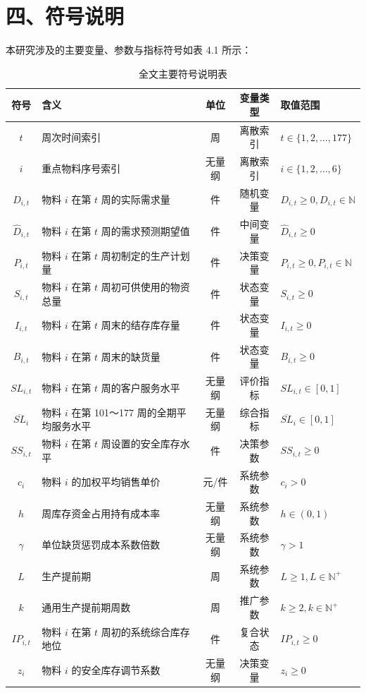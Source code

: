 \section{四、符号说明}\label{ux56dbux7b26ux53f7ux8bf4ux660e}

本研究涉及的主要变量、参数与指标符号如表 4.1 所示：

\begin{table}[H]
\centering
\caption{全文主要符号说明表}
\label{tab:notation}
\begin{tabular}{clccl}
\toprule
\textbf{符号} & \textbf{含义} & \textbf{单位} & \textbf{变量类型} & \textbf{取值范围} \\
\midrule
$t$ & 周次时间索引 & 周 & 离散索引 & $t \in \{1, 2, \dots, 177\}$ \\
$i$ & 重点物料序号索引 & 无量纲 & 离散索引 & $i \in \{1, 2, \dots, 6\}$ \\
$D_{i,t}$ & 物料 $i$ 在第 $t$ 周的实际需求量 & 件 & 随机变量 & $D_{i,t} \ge 0, D_{i,t} \in \mathbb{N}$ \\
$\hat{D}_{i,t}$ & 物料 $i$ 在第 $t$ 周的需求预测期望值 & 件 & 中间变量 & $\hat{D}_{i,t} \ge 0$ \\
$P_{i,t}$ & 物料 $i$ 在第 $t$ 周初制定的生产计划量 & 件 & 决策变量 & $P_{i,t} \ge 0, P_{i,t} \in \mathbb{N}$ \\
$S_{i,t}$ & 物料 $i$ 在第 $t$ 周初可供使用的物资总量 & 件 & 状态变量 & $S_{i,t} \ge 0$ \\
$I_{i,t}$ & 物料 $i$ 在第 $t$ 周末的结存库存量 & 件 & 状态变量 & $I_{i,t} \ge 0$ \\
$B_{i,t}$ & 物料 $i$ 在第 $t$ 周末的缺货量 & 件 & 状态变量 & $B_{i,t} \ge 0$ \\
$SL_{i,t}$ & 物料 $i$ 在第 $t$ 周的客户服务水平 & 无量纲 & 评价指标 & $SL_{i,t} \in [0, 1]$ \\
$\overline{SL}_i$ & 物料 $i$ 在第 101～177 周的全期平均服务水平 & 无量纲 & 综合指标 & $\overline{SL}_i \in [0, 1]$ \\
$SS_{i,t}$ & 物料 $i$ 在第 $t$ 周设置的安全库存水平 & 件 & 决策参数 & $SS_{i,t} \ge 0$ \\
$c_i$ & 物料 $i$ 的加权平均销售单价 & 元/件 & 系统参数 & $c_i > 0$ \\
$h$ & 周库存资金占用持有成本率 & 无量纲 & 系统参数 & $h \in (0, 1)$ \\
$\gamma$ & 单位缺货惩罚成本系数倍数 & 无量纲 & 系统参数 & $\gamma > 1$ \\
$L$ & 生产提前期 & 周 & 系统参数 & $L \ge 1, L \in \mathbb{N}^+$ \\
$k$ & 通用生产提前期周数 & 周 & 推广参数 & $k \ge 2, k \in \mathbb{N}^+$ \\
$IP_{i,t}$ & 物料 $i$ 在第 $t$ 周初的系统综合库存地位 & 件 & 复合状态 & $IP_{i,t} \ge 0$ \\
$z_i$ & 物料 $i$ 的安全库存调节系数 & 无量纲 & 决策变量 & $z_i \ge 0$ \\
\bottomrule
\end{tabular}
\end{table}
